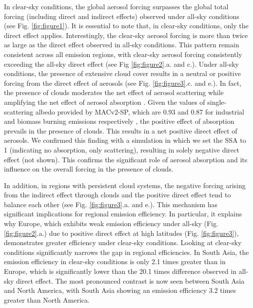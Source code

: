 \documentclass[draft]{agujournal2019}
\begin{document}
            In clear-sky conditions, the global aerosol forcing surpasses the global total forcing (including direct and indirect effects) observed under all-sky conditions (see Fig. \ref{fig:figure1}). It is essential to note that, in clear-sky conditions, only the direct effect applies. Interestingly, the clear-sky aerosol forcing is more than twice as large as the direct effect observed in all-sky conditions. This pattern remain consistent across all emission regions, with clear-sky aerosol forcing consistently exceeding the all-sky direct effect (see Fig \ref{fig:figure2}.a. and c.). 
            Under all-sky conditions, the presence of extensive cloud cover results in a neutral or positive forcing from the direct effect of aerosols (see Fig. \ref{fig:figure3}.c. and e.). In fact, the presence of clouds moderates the net effect of aerosol scattering while amplifying the net effect of aerosol absorption \cite{Li_2022}. Given the values of single-scattering albedo provided by MACv2-SP, which are 0.93 and 0.87 for industrial and biomass burning emissions respectively \cite{Stevens_2017}, the positive effect of absorption prevails in the presence of clouds. This results in a net positive direct effect of aerosols. We confirmed this finding with a simulation in which we set the SSA to 1 (indicating no absorption, only scattering), resulting in solely negative direct effect (not shown). This confirms the significant role of aerosol absorption and its influence on the overall forcing in the presence of clouds.
            
            In addition, in regions with persistent cloud systems, the negative forcing arising from the indirect effect through clouds and the positive direct effect tend to balance each other (see Fig. \ref{fig:figure3}.a. and e.).
            This mechanism has significant implications for regional emission efficiency. In particular, it explains why Europe, which exhibits weak emission efficiency under all-sky (Fig. \ref{fig:figure2}.a.) due to positive direct effect at high latitudes (Fig. \ref{fig:figure3}), demonstrates greater efficiency under clear-sky conditions. Looking at clear-sky conditions significantly narrows the gap in regional efficiencies. 
            In South Asia, the emission efficiency in clear-sky conditions is only 2.1 times greater than in Europe, which is significantly lower than the 20.1 times difference observed in all-sky direct effect. The most pronounced contrast is now seen between South Asia and North America, with South Asia showing an emission efficiency 3.2 times greater than North America.
\end{document}
